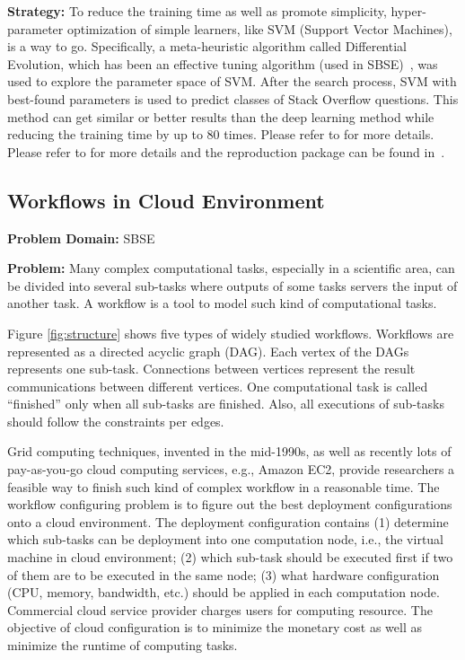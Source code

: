 \documentclass[sigconf,anonymous,review]{acmart}
\begin{document}
\noindent\textbf{Strategy: }To reduce the training time as well as promote simplicity, hyper-parameter optimization of simple learners, like SVM (Support Vector Machines), is a way to go. Specifically, a {meta-heuristic algorithm called} Differential Evolution, which has been an effective tuning algorithm (used in SBSE)~\cite{fu2016tuning},
was used to explore the parameter space of SVM. After the search process,
 SVM with best-found parameters is used to predict classes of Stack Overflow questions. This method can get similar or better results
than the deep learning method while reducing the training time by up to 80 times. Please refer to \cite{fu2017easy} for more details. Please refer to \cite{fu2017easy} for more details and the reproduction package can be found in~.



    \subsection{Workflows in Cloud Environment}
\textbf{Problem Domain: } SBSE


\noindent\textbf{Problem:} Many complex computational tasks, especially in a scientific area, can be divided into several sub-tasks where outputs of some tasks servers the input of another task. A workflow is a tool to
model such kind of computational tasks.



Figure \ref{fig:structure} shows five types of widely studied workflows. Workflows are represented as a directed acyclic graph (DAG). Each vertex of the DAGs represents one sub-task. Connections between vertices represent the result communications between different vertices. One computational task is called ``finished'' only when
all sub-tasks are finished. Also, all executions of sub-tasks should follow the constraints per edges.

Grid computing techniques, invented in the mid-1990s, as well as recently lots of pay-as-you-go cloud computing services, e.g., Amazon EC2, provide researchers a feasible way to finish such kind of complex workflow in a reasonable time.
The workflow configuring problem is to figure out the best deployment configurations onto a cloud environment. The deployment configuration
contains (1) determine which sub-tasks can be deployment into
one computation node, i.e., the virtual machine in cloud environment; (2) which sub-task should be executed first if two of them are to be executed in the same node; (3) what hardware configuration (CPU, memory, bandwidth, etc.) should be applied in each computation node. Commercial cloud service provider charges users for computing resource. 
The objective of cloud configuration is to minimize the monetary cost as well as minimize the runtime of computing tasks.
\end{document}
